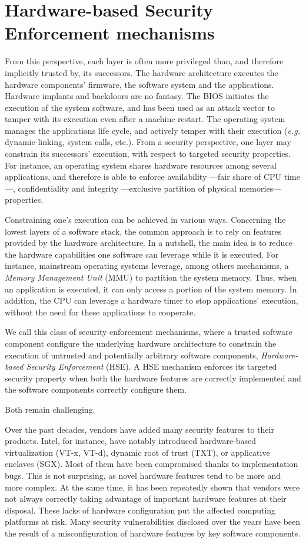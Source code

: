 \section{Hardware-based Security Enforcement mechanisms}

From this perspective, each layer is often more privileged than, and therefore
implicitly trusted by, its successors.
%
The hardware architecture executes the hardware components' firmware, the
software system and the applications.
%
Hardware implants and backdoors are no fantasy.
%
The BIOS initiates the execution of the system software, and has been used as an
attack vector to tamper with its execution even after a machine restart.
%
The operating system manages the applications life cycle, and actively temper
with their execution (\emph{e.g.} dynamic linking, system calls, etc.).
%
From a security perspective, one layer may constrain its successors' execution,
with respect to targeted security properties.
%
For instance, an operating system shares hardware resources among several
applications, and therefore is able to enforce availability ---fair share of CPU
time---, confidentiality and integrity ---exclusive partition of physical
memories--- properties.

Constraining one's execution can be achieved in various ways.
%
Concerning the lowest layers of a software stack, the common approach is to rely
on features provided by the hardware architecture.
%
In a nutshell, the main idea is to reduce the hardware capabilities one software
can leverage while it is executed.
%
For instance, mainstream operating systems leverage, among others mechanisms, a
\emph{Memory Management Unit} (MMU) to partition the system memory.
%
Thus, when an application is executed, it can only access a portion of the
system memory.
%
In addition, the CPU can leverage a hardware timer to stop applications'
execution, without the need for these applications to cooperate.

We call this class of security enforcement mechanisms, where a trusted software
component configure the underlying hardware architecture to constrain the
execution of untrusted and potentially arbitrary software components,
\emph{Hardware-based Security Enforcement} (HSE).
%
A HSE mechanism enforces its targeted security property when both the hardware
features are correctly implemented and the software components correctly
configure them.

Both remain challenging.

Over the past decades, vendors have added many security features to their
products.
%
Intel, for instance, have notably introduced hardware-based virtualization
(VT-x, VT-d), dynamic root of trust (TXT), or applicative enclaves (SGX).
%
Most of them have been compromised thanks to implementation bugs.
%
This is not surprising, as novel hardware features tend to be more and more
complex.
%
At the same time, it has been repeatedly shown that vendors were not always
correctly taking advantage of important hardware features at their disposal.
%
These lacks of hardware configuration put the affected computing platforms at
risk.
%
Many security vulnerabilities disclosed over the years have been the result of a
misconfiguration of hardware features by key software components.

